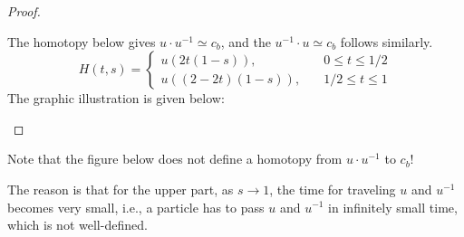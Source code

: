 \begin{proof}
\begin{enumerate}
The homotopy below gives $u\cdot u^{-1}\simeq c_b$, and the $u^{-1}\cdot u\simeq c_b$ follows similarly.
\[
H(t,s)=\left\{
\begin{aligned}
u(2t(1-s)),&\quad 0\le t\le 1/2\\
u((2-2t)(1-s)),&\quad 1/2\le t\le 1
\end{aligned}
\right.
\]
The graphic illustration is given below:
\begin{figure}[H]
	\label{fig: 1:10}
\end{figure}
\end{enumerate}
\end{proof}
\begin{remark}
Note that the figure below does not define a homotopy from $u\cdot u^{-1}$ to $c_b$!
\begin{figure}[H]
\end{figure}
The reason is that for the upper part, as $s\to1$, the time for traveling $u$ and $u^{-1}$ becomes very small, i.e., a particle has to pass $u$ and $u^{-1}$ in infinitely small time, which is not well-defined.
\end{remark}


